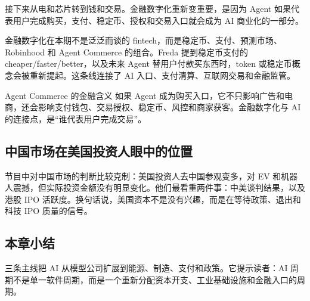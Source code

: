 接下来从电和芯片转到钱和交易。金融数字化重新变重要，是因为 Agent 如果代表用户完成购买，支付、稳定币、授权和交易入口就会成为 AI 商业化的一部分。

金融数字化在本期不是泛泛而谈的 fintech，而是稳定币、支付、预测市场、Robinhood 和 Agent Commerce 的组合。Freda 提到稳定币支付的 cheaper/faster/better，以及未来 Agent 替用户付款买东西时，token 或稳定币概念会被重新提起。这条线连接了 AI 入口、支付清算、互联网交易和金融监管。

\begin{importantbox}{Agent Commerce 的金融含义}
如果 Agent 成为购买入口，它不只影响广告和电商，还会影响支付钱包、交易授权、稳定币、风控和商家获客。金融数字化与 AI 的连接点，是“谁代表用户完成交易”。
\end{importantbox}

\subsection{中国市场在美国投资人眼中的位置}

节目中对中国市场的判断比较克制：美国投资人去中国参观变多，对 EV 和机器人震撼，但实际投资金额没有明显变化。他们最看重两件事：中美谈判结果，以及港股 IPO 活跃度。换句话说，美国资本不是没有兴趣，而是在等待政策、退出和科技 IPO 质量的信号。

\subsection{本章小结}

三条主线把 AI 从模型公司扩展到能源、制造、支付和政策。它提示读者：AI 周期不是单一软件周期，而是一个重新分配资本开支、工业基础设施和金融入口的周期。

